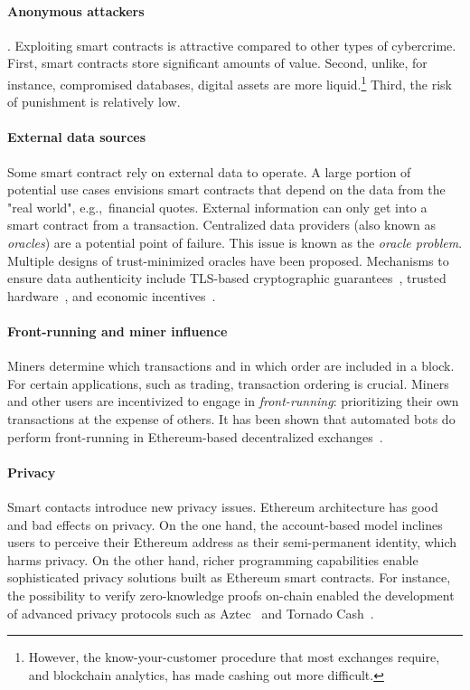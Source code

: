 \paragraph{Anonymous attackers}.
Exploiting smart contracts is attractive compared to other types of cybercrime.
First, smart contracts store significant amounts of value.
Second, unlike, for instance, compromised databases, digital assets are more liquid.\footnote{However, the know-your-customer procedure that most exchanges require, and blockchain analytics, has made cashing out more difficult.}
Third, the risk of punishment is relatively low.

\paragraph{External data sources}
Some smart contract rely on external data to operate.
A large portion of potential use cases envisions smart contracts that depend on the data from the "real world", e.g.,~financial quotes.
External information can only get into a smart contract from a transaction.
Centralized data providers (also known as \textit{oracles}) are a potential point of failure.
This issue is known as the \textit{oracle problem}.
Multiple designs of trust-minimized oracles have been proposed.
Mechanisms to ensure data authenticity include TLS-based cryptographic guarantees~\cite{Provable}, trusted hardware~\cite{Zhang2016}, and economic incentives~\cite{Chainlink}.

\paragraph{Front-running and miner influence}
Miners determine which transactions and in which order are included in a block.
For certain applications, such as trading, transaction ordering is crucial.
Miners and other users are incentivized to engage in \textit{front-running}: prioritizing their own transactions at the expense of others.
It has been shown that automated bots do perform front-running in Ethereum-based decentralized exchanges~\cite{Daian2019}.

\paragraph{Privacy}
Smart contacts introduce new privacy issues.
Ethereum architecture has good and bad effects on privacy.
On the one hand, the account-based model inclines users to perceive their Ethereum address as their semi-permanent identity, which harms privacy.
On the other hand, richer programming capabilities enable sophisticated privacy solutions built as Ethereum smart contracts.
For instance, the possibility to verify zero-knowledge proofs on-chain enabled the development of advanced privacy protocols such as Aztec~\cite{Aztec} and Tornado Cash~\cite{TornadoCash}.

